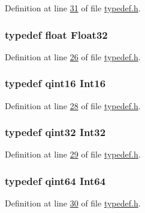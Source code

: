 Definition at line \hyperlink{a00001_source_l00031}{31} of file \hyperlink{a00001_source}{typedef.\+h}.

\hypertarget{a00001_a87d38f886e617ced2698fc55afa07637}{
\subsubsection[{Float32}]{\setlength{\rightskip}{0pt plus 5cm}typedef float {\bf Float32}}}\label{a00001_a87d38f886e617ced2698fc55afa07637}


Definition at line \hyperlink{a00001_source_l00026}{26} of file \hyperlink{a00001_source}{typedef.\+h}.

\hypertarget{a00001_a3985266aecb120f269789241c170850c}{
\subsubsection[{Int16}]{\setlength{\rightskip}{0pt plus 5cm}typedef qint16 {\bf Int16}}}\label{a00001_a3985266aecb120f269789241c170850c}


Definition at line \hyperlink{a00001_source_l00028}{28} of file \hyperlink{a00001_source}{typedef.\+h}.

\hypertarget{a00001_a08efbac01a8d7a9e41a7aa093260ca4a}{
\subsubsection[{Int32}]{\setlength{\rightskip}{0pt plus 5cm}typedef qint32 {\bf Int32}}}\label{a00001_a08efbac01a8d7a9e41a7aa093260ca4a}


Definition at line \hyperlink{a00001_source_l00029}{29} of file \hyperlink{a00001_source}{typedef.\+h}.

\hypertarget{a00001_a71a4edacadbbbcd18988a2f09f959b1e}{
\subsubsection[{Int64}]{\setlength{\rightskip}{0pt plus 5cm}typedef qint64 {\bf Int64}}}\label{a00001_a71a4edacadbbbcd18988a2f09f959b1e}


Definition at line \hyperlink{a00001_source_l00030}{30} of file \hyperlink{a00001_source}{typedef.\+h}.

